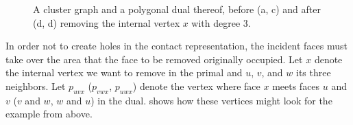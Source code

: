 \begin{figure}[H]
	\centering
	\quad
	\qquad
	\quad
	\caption{A cluster graph and a polygonal dual thereof, before (a, c) and after (d, d) removing the internal vertex $x$ with degree 3.}
	\label{fig:remove-vertex-example-internal}
\end{figure}

In order not to create holes in the contact representation, the incident faces must take over the area that the face to be removed originally occupied.
Let $x$ denote the internal vertex we want to remove in the primal and $u$, $v$, and $w$ its three neighbors.
Let $p_{uvx}$ ($p_{vwx}$, $p_{uwx}$) denote the vertex where face $x$ meets faces $u$ and $v$ ($v$ and $w$, $w$ and $u$) in the dual.
 shows how these vertices might look for the example from above.

